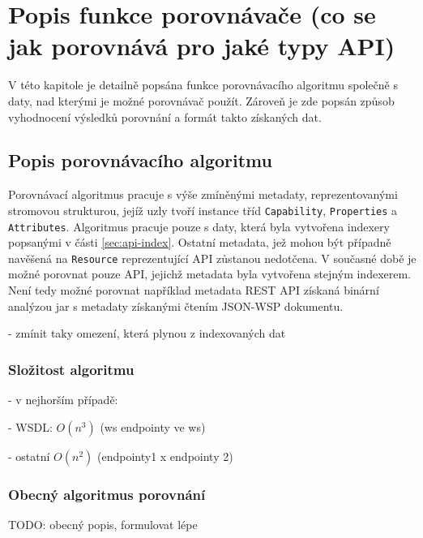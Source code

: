 \documentclass[czech,DP]{thesiskiv}
\begin{document}
\chapter{Popis funkce porovnávače (co se jak porovnává pro jaké typy API)}

V této kapitole je detailně popsána funkce porovnávacího algoritmu společně s daty, nad kterými je možné porovnávač použít. Zároveň je zde popsán způsob vyhodnocení výsledků porovnání a formát takto získaných dat.

\section{Popis porovnávacího algoritmu}

Porovnávací algoritmus pracuje s výše zmíněnými metadaty, reprezentovanými stromovou strukturou, jejíž uzly tvoří instance tříd \verb|Capability|, \verb|Properties| a \verb|Attributes|. Algoritmus pracuje pouze s daty, která byla vytvořena indexery popsanými v části \ref{sec:api-index}. Ostatní metadata, jež mohou být případně navěšená na \verb|Resource| reprezentující API zůstanou nedotčena. V současné době je možné porovnat pouze API, jejichž metadata byla vytvořena stejným indexerem. Není tedy možné porovnat například metadata REST API získaná binární analýzou jar s metadaty získanými čtením JSON-WSP dokumentu.

- zmínit taky omezení, která plynou z indexovaných dat

\subsection{Složitost algoritmu}

- v nejhorším případě:

	- WSDL: $O(n^3)$ (ws endpointy ve ws)
	
	- ostatní $O(n^2)$ (endpointy1 x endpointy 2)

\subsection{Obecný algoritmus porovnání}

TODO: obecný popis, formulovat lépe
\end{document}
